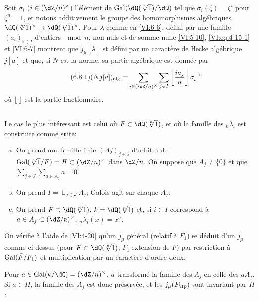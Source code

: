 Soit $\sigma_i$ ($i\in (\dZ/n)^\times$) l'\'el\'ement de 
$\gal(\dQ(\sqrt[n]{1})/\dQ)$ tel que $\sigma_i(\zeta)=\zeta^i$ pour $\zeta^n=1$, 
et notons additivement le groupe des homomorphismes alg\'ebriques 
$\dQ(\sqrt[n]{1})^\times \to \dQ(\sqrt[n]{1})^\times$. Pour $\lambda$ comme en 
\ref{VI:6-6}, d\'efini par une famille $(a_i)_{i\in I}$ d'entiers $\mod n$, non 
nuls et de somme nulle \ref{VI:5-10}, \eqref{VI:eq:4-15-1} et \ref{VI:6-7} 
montrent que $j_\mu[\lambda]$ st d\'efini par un caract\`ere de Hecke 
alg\'ebrique $j[a]$ et que, si $N$ est la norme, sa partie alg\'ebrique est 
donn\'ee par 
\begin{equation*}\tag{6.8.1}\label{VI:eq:6-8-1}
  (N j[a])_\text{alg} = \sum_{i\in (\dZ/n)^\times} \sum_{j\in I} \left \lfloor \frac{i a_j}{n} \right\rfloor \sigma_i^{-1} 
\end{equation*}
o\`u $\lfloor \cdot \rfloor$ est la partie fractionnaire. 





\subsection{}\label{VI:6-9}

Le cas le plus int\'eressant est celui o\`u $F\subset \dQ(\sqrt[n]{1})$, et 
o\`u la famille des $_n \lambda_i$ est construite comme suite: 
\begin{enumerate}[a)]
  \item On prend une famille finie $(Aj)_{j\in J}$ d'orbites de 
    $\gal(\sqrt[n]{1}/F)=H\subset (\dZ/n)^\times$ dans $\dZ/n$. On suppose que 
    $A_j\ne\{0\}$ et que $\sum_{j\in J} \sum_{a\in A_j} a=0$. 
  \item On prend $I=\sqcup_{j\in J} A_j$; Galois agit sur chaque $A_j$. 
  \item On prend $\bar F\supset \dQ(\sqrt[n]{1})$, $k=\dQ(\sqrt[n]{1})$ et, si 
    $i\in I$ correspond \`a $a\in A_j\subset (\dZ/n)^\times$, 
    $_n\lambda_i(x)=x^a$. 
\end{enumerate}

On v\'erifie \`a l'aide de \ref{VI:4-20} qu'un $j_\mu$ g\'en\'eral (relatif \`a 
$F_1$) se d\'eduit d'un $j_\mu$ comme ci-dessus (pour 
$F\subset \dQ(\sqrt[n]{1})$, $F_1$ extension de $F$) par restriction \`a 
$\operatorname{Gal}(\bar F/F_1)$ et multiplication par un caract\`ere d'ordre deux. 

Pour $a\in \gal(k/\dQ)=(\dZ/n)^\times$, $a$ transform\'e la famille des $A_j$ 
en celle des $a A_j$. Si $a\in H$, la famille des $A_j$ est donc pr\'eserv\'ee, 
et les $j_\mu(F_\fp)$ sont invariant par $H$: 





